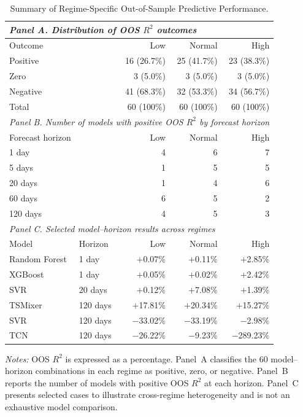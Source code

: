 \documentclass[12pt,twoside]{ord}
\begin{document}
\begin{table}[htbp]
\centering
\caption{Summary of Regime-Specific Out-of-Sample Predictive Performance.}\label{tab:selected_regime_oos_r2}
\setlength{\tabcolsep}{6pt}
\begin{tabular}{llrrr}
\hline
\multicolumn{5}{l}{\textit{Panel A. Distribution of OOS $R^2$ outcomes}} \\
\hline
\multicolumn{2}{l}{Outcome} & Low & Normal & High \\
\hline
\multicolumn{2}{l}{Positive} & 16 (26.7\%) & 25 (41.7\%) & 23 (38.3\%) \\
\multicolumn{2}{l}{Zero} & 3 (5.0\%) & 3 (5.0\%) & 3 (5.0\%) \\
\multicolumn{2}{l}{Negative} & 41 (68.3\%) & 32 (53.3\%) & 34 (56.7\%) \\
\multicolumn{2}{l}{Total} & 60 (100\%) & 60 (100\%) & 60 (100\%) \\
\hline
\multicolumn{5}{l}{\textit{Panel B. Number of models with positive OOS $R^2$ by forecast horizon}} \\
\hline
\multicolumn{2}{l}{Forecast horizon} & Low & Normal & High \\
\hline
\multicolumn{2}{l}{1 day} & 4 & 6 & 7 \\
\multicolumn{2}{l}{5 days} & 1 & 5 & 5 \\
\multicolumn{2}{l}{20 days} & 1 & 4 & 6 \\
\multicolumn{2}{l}{60 days} & 6 & 5 & 2 \\
\multicolumn{2}{l}{120 days} & 4 & 5 & 3 \\
\hline
\multicolumn{5}{l}{\textit{Panel C. Selected model--horizon results across regimes}} \\
\hline
Model & Horizon & Low & Normal & High \\
\hline
Random Forest & 1 day & $+$0.07\% & $+$0.11\% & $+$2.85\% \\
XGBoost & 1 day & $+$0.05\% & $+$0.02\% & $+$2.42\% \\
SVR & 20 days & $+$0.12\% & $+$7.08\% & $+$1.39\% \\
TSMixer & 120 days & $+$17.81\% & $+$20.34\% & $+$15.27\% \\
SVR & 120 days & $-$33.02\% & $-$33.19\% & $-$2.98\% \\
TCN & 120 days & $-$26.22\% & $-$9.23\% & $-$289.23\% \\
\hline
\end{tabular}
\par\vspace{4pt}\parbox{\linewidth}{\fontsize{9pt}{12pt}\selectfont\textit{Notes:} OOS $R^2$ is expressed as a percentage. Panel~A classifies the 60 model--horizon combinations in each regime as positive, zero, or negative. Panel~B reports the number of models with positive OOS $R^2$ at each horizon. Panel~C presents selected cases to illustrate cross-regime heterogeneity and is not an exhaustive model comparison.}
\end{table}
\end{document}
